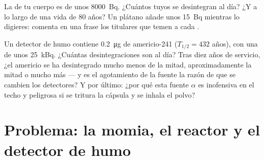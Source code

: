 \begin{exercise}[$\star\star\star$]\label{exo:g11:nucleus-radioactivity:14}
La  de tu cuerpo es de unos \qty{8000}{Bq}. ¿Cuántos 
tuyos se desintegran al día? ¿Y a lo largo de una vida de $80$ años? Un
plátano añade unos \qty{15}{Bq} mientras lo digieres: comenta en una
frase los titulares que temen a cada .
\end{exercise}

\begin{exercise}[$\star\star\star$]\label{exo:g11:nucleus-radioactivity:15}
Un detector de humo contiene \qty{0.2}{\micro\gram} de americio-241
($T_{1/2} = 432$ años), con una  de unos \qty{25}{kBq}.
¿Cuántas desintegraciones son al día? Tras diez años de servicio, ¿el
americio se ha desintegrado mucho menos de la mitad, aproximadamente la
mitad o mucho más --- y es el agotamiento de la fuente la razón de que
se cambien los detectores? Y por último: ¿por qué esta fuente $\alpha$ es
inofensiva en el techo y peligrosa si se tritura la cápsula y se inhala
el polvo?
\end{exercise}

\section{Problema: la momia, el reactor y el detector de humo}

